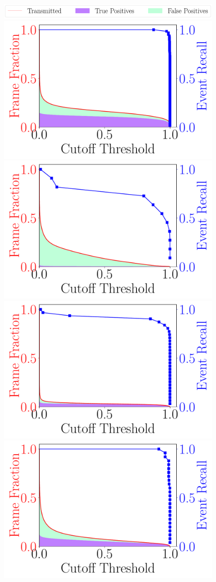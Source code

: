 \begin{figure}
    \centering
    \includegraphics[width=0.8\linewidth]{FIGS/fig-event-recall-frame-percentage-legend.pdf}
    \hspace*{-0.3in}
    \includegraphics[width=.5\linewidth]{FIGS/fig-event-recall-frame-percentage-vs-threshold-okutama.pdf}
    \includegraphics[width=0.5\linewidth]{FIGS/fig-event-recall-frame-percentage-vs-threshold-stanford.pdf}
    \includegraphics[width=0.5\linewidth]{FIGS/fig-event-recall-frame-percentage-vs-threshold-raft.pdf}
    \includegraphics[width=0.5\linewidth]{FIGS/fig-event-recall-frame-percentage-vs-threshold-elephant.pdf}
    

\end{figure}

